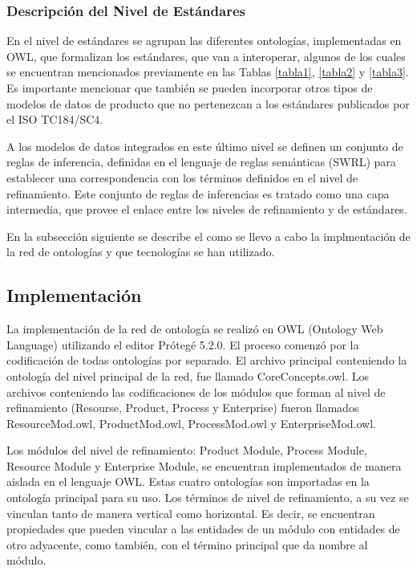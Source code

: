 \documentclass[journal]{IEEEtran}
\begin{document}
\subsubsection{Descripci\'on del Nivel de Est\'andares}

En el nivel de est\'andares se agrupan las diferentes ontolog\'ias, implementadas en OWL, que formalizan los est\'andares, que van a interoperar, algunos de los cuales se encuentran mencionados previamente en las Tablas \ref{tabla1}, \ref{tabla2} y \ref{tabla3}. Es importante mencionar que tambi\'en se pueden incorporar otros tipos de modelos de datos de producto que no pertenezcan a los est\'andares publicados por el ISO TC184/SC4.  

A los modelos de datos integrados en este \'ultimo nivel se definen un conjunto de reglas de inferencia, definidas en el lenguaje de reglas sem\'anticas (SWRL) para establecer una correspondencia con los t\'erminos definidos en el nivel de refinamiento. Este conjunto de reglas de inferencias es tratado como una capa intermedia, que provee el enlace entre los niveles de refinamiento y de est\'andares. 


En la subsecci\'on siguiente se describe el como se llevo a cabo la implmentaci\'on de la red de ontolog\'ias y que tecnolog\'ias se han utilizado.

\subsection{Implementaci\'on}

La implementaci\'on de la red de ontolog\'ia se realiz\'o en OWL (Ontology Web Language) utilizando el editor Pr\'oteg\'e 5.2.0. El proceso comenz\'o por la codificaci\'on de todas ontolog\'ias por separado. El archivo principal conteniendo la ontolog\'ia del nivel principal de la red, fue llamado CoreConcepts.owl. Los archivos conteniendo las codificaciones de los m\'odulos que forman al nivel de refinamiento (Resourse, Product, Process y Enterprise) fueron llamados ResourceMod.owl, ProductMod.owl, ProcessMod.owl y EnterpriseMod.owl. 

Los m\'odulos del nivel de refinamiento: Product Module, Process Module, Resource Module y Enterprise Module, se encuentran implementados de manera aislada en el lenguaje OWL. Estas cuatro ontolog\'ias son importadas en la ontolog\'ia   principal para su uso. Los t\'erminos de nivel de refinamiento, a su vez se vinculan tanto de manera vertical como horizontal. Es decir, se encuentran propiedades que pueden vincular a las entidades de un m\'odulo con entidades de otro adyacente, como tambi\'en, con el t\'ermino principal que da nombre al m\'odulo. 
\end{document}
